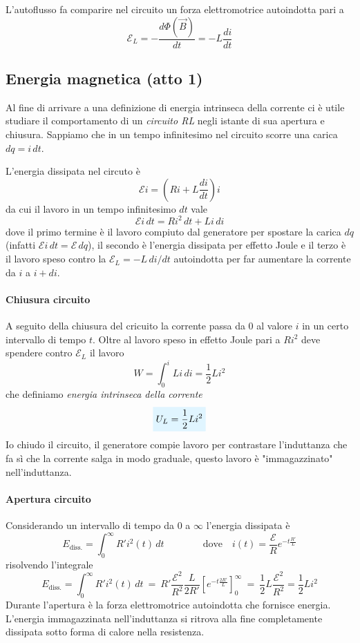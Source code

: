 \documentclass[x11names]{report}
\newcommand{\viola}[1]{%
	\colorbox{myblue}{$\displaystyle #1$}
}
\begin{document}
L'autoflusso fa comparire nel circuito un forza elettromotrice autoindotta pari a 
\[
\mathcal{E}_L= - \frac{d\Phi(\vec{B})}{dt} = - L\frac{di}{dt}
\]

\subsection{Energia magnetica (atto 1)}
Al fine di arrivare a una definizione di energia intrinseca della corrente ci è utile studiare il comportamento di un \textit{circuito RL} negli istante di sua apertura e chiusura. Sappiamo che in un tempo infinitesimo nel circuito scorre una carica \(dq = i \, dt\).

L'energia dissipata nel circuto è
\[
\mathcal{E}i = \left(Ri + L\frac{di}{dt}\right)i
\]
da cui il lavoro in un tempo infinitesimo \(dt\) vale
\[
\mathcal{E}i \, dt = Ri^2 \, dt + Li \, di
\]
dove il primo termine è il lavoro compiuto dal generatore per spostare la carica \(dq\) (infatti \(\mathcal{E}i \, dt  = \mathcal{E} \, dq \)), il secondo è l'energia dissipata per effetto Joule e il terzo è il lavoro speso contro la \(\mathcal{E}_L = -L \, di/dt\) autoindotta per far aumentare la corrente da \(i\) a \(i + di\).

\paragraph{Chiusura circuito} A seguito della chiusura del cricuito la corrente passa da \(0\) al valore \(i\) in un certo intervallo di tempo \(t\). Oltre al lavoro speso in effetto Joule pari a \(Ri^2\) deve spendere contro \(\mathcal{E}_L\) il lavoro
\[
W = \int_{0}^{i}Li \, di = \frac{1}{2}Li^2
\]
che definiamo \textit{energia intrinseca della corrente}
\begin{equation}
	\viola{U_L = \frac{1}{2}Li^2}
\end{equation}
Io chiudo il circuito, il generatore compie lavoro per contrastare l'induttanza che fa sì che la corrente salga in modo graduale, questo lavoro è "immagazzinato" nell'induttanza.

\paragraph{Apertura circuito} 
Considerando un intervallo di tempo da \(0\) a \(\infty\) l'energia dissipata è 
\[
E_{\text{diss.}} = \int_{0}^{\infty} R'i^2(t) \, dt \qquad \qquad \text{dove} \quad i(t) = \frac{\mathcal{E}}{R}e^{-t\frac{R'}{L}} 
\]
risolvendo l'integrale
\[
 E_{\text{diss.}} = \int_{0}^{\infty} R'i^2(t) \, dt \: = \: R'\frac{\mathcal{E}^2}{R^2} \frac{L}{2R'}\left[e^{-t\frac{2R'}{L}}\right]_0^\infty \: = \: \frac{1}{2}L\frac{\mathcal{E}^2}{R^2} = \frac{1}{2}Li^2
\]
Durante l'apertura è la forza elettromotrice autoindotta che fornisce energia. L'energia immagazzinata nell'induttanza si ritrova alla fine completamente dissipata sotto forma di calore nella resistenza.
\end{document}
